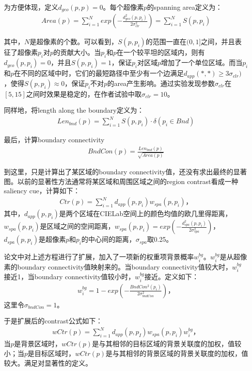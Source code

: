 \documentclass[12pt]{article}
\begin{document}
为方便体现，定义$d_{geo}(p, p) = 0$。每个超像素$p$的spanning area定义为：
\begin{align}
Area(p) = \sum_{i=1}^N exp(-\frac{d_{geo}^2(p, p_i)}{2\sigma_{clr}^2})=\sum_{i=1}^N S(p, p_i)
\end{align}

其中，$N$是超像素的个数。可以看到，$S(p, p_i)$的范围一直在$(0, 1]$之间，并且表征了超像素$p_i$对$p$的贡献大小。当$p_i$和$p$在一个较平坦的区域内，则有$d_{geo}(p, p_i) = 0$，并且$S(p, p_i) =1$，保证$p_i$对区域$p$增加了一个单位区域。而当$p_i$和$p$在不同的区域中时，它们的最短路径中至少有一个边满足$d_{app}(*, *)\ge 3\sigma_{clr})$，使得$S(p, p_i)\approx0$，保证$p_i$不对$p$的area产生影响。通过实验发现参数$\sigma_{clr}$在$[5,15]$之间时效果是稳定的，在作者试验中取$\sigma_{clr}=10$。

同样地，将length along the boundary定义为：
\begin{align}
Len_{bnd}(p) = \sum_{i=1}^N S(p, p_i) \cdot \delta(p_i \in Bnd)
\end{align}

最后，计算boundary connectivity
\begin{align}
BndCon(p) = \frac{Len_{bnd}(p)}{\sqrt{Area(p)}}
\end{align}

到这里，只是计算出了某区域的boundary connectivity值，还没有求出最终的显著图。以前的显著性方法通常将某区域和周围区域之间的region contrast看成一种saliency cue，计算如下：
\begin{align}
Ctr(p) = \sum_{i=1}^{N}d_{app}(p, p_i)w_{spa}(p, p_i)，
\end{align}
其中，$d_{app}(p, p_i)$是两个区域在CIELab空间上的颜色均值的欧几里得距离，$w_{spa}(p, p_i)$是区域之间的空间距离，$w_{spa}(p, p_i) = exp(-\frac{d_{spa}^2(p, p_i)}{2\sigma_{spa}^2})$，$d_{spa}(p, p_i)$是超像素$p$和$p_i$的中心间的距离，$\sigma_{spa}$取0.25。

论文中对上述方程进行了扩展，加入了一项新的权重项背景概率$w_i^{bg}$。$w_i^{bg}$是从超像素的boundary connectivity值映射来的。当boundary connectivity值较大时，$w_i^{bg}$接近1，当boundary connectivity值较小时，$w_i^{bg}$接近。定义如下：
\begin{align}
w_i^{bg} = 1-exp(-\frac{BndCon^2(p_i)}{2\sigma_{bndCon}^2})，
\end{align}
这里令$\sigma_{bndCon}=1$。

于是扩展后的contrast公式如下：
\begin{align}
wCtr(p) = \sum_{i=1}^{N}d_{app}(p, p_I)w_{spa}(p, p_i)w_i^{bg}，
\end{align}
当$p$是背景区域时，$wCtr(p)$是与其相邻的目标区域的背景关联度的加权，值较小；当$p$是目标区域时，$wCtr(p)$是与其相邻的背景区域的背景关联度的加权，值较大。满足对显著性的定义。
\end{document}
